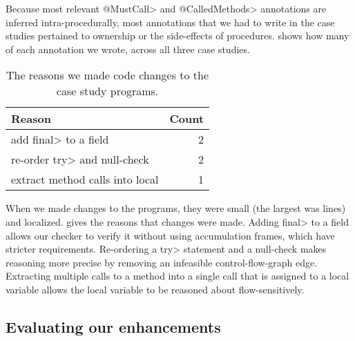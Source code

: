Because most relevant \<@MustCall> and \<@CalledMethods> annotations
are inferred intra-procedurally, most annotations that we had to write in
the case studies pertained to ownership or the side-effects of procedures.
 shows how many of each annotation we wrote, across all three
case studies.

\begin{table}
  \caption{The reasons we made code changes to the
    case study programs.}
  \label{tab:changes}
  \begin{tabularx}{\columnwidth}{@{}Xr@{}}
    Reason                            &      Count     \\
    \hline
    add \<final> to a field           &     2   \\
    re-order \<try> and null-check    &     2   \\
    extract method calls into local   &     1   \\
  \end{tabularx}
\end{table}

When we made changes to the programs, they were small (the largest was  lines)
and localized.  gives the reasons that changes were made.
%
Adding \<final> to a field allows our checker to verify it without using
accumulation frames, which have stricter requirements.
%
Re-ordering a \<try>
statement and a null-check makes reasoning more precise by removing an
infeasible control-flow-graph edge.
%
Extracting multiple calls to a method
into a single call that is assigned to a local variable allows the local
variable to be reasoned about flow-sensitively.

\subsection{Evaluating our enhancements}
\label{sec:ablation}

\newcommand{\abltablerow}[4]{\textbf{\smaller{#1}} & #2 & #3 & #4}

